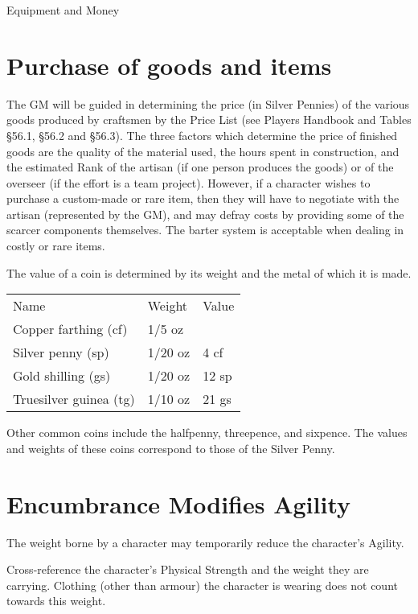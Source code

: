 \begin{Chapter}{Equipment and Money}

\section{Purchase of goods and items}

The GM will be guided in determining the price (in Silver Pennies) of
the various goods produced by craftsmen by the Price List (see Players
Handbook and Tables §56.1, §56.2 and §56.3).  The three factors which
determine the price of finished goods are the quality of the material
used, the hours spent in construction, and the estimated Rank of the
artisan (if one person produces the goods) or of the overseer (if the
effort is a team project). However, if a character wishes to purchase
a custom-made or rare item, then they will have to negotiate with the
artisan (represented by the GM), and may defray costs by providing
some of the scarcer components themselves.  The barter system is
acceptable when dealing in costly or rare items.

The value of a coin is determined by its weight and the metal of which
it is made.

\begin{tabularx}{\columnwidth}{lll}
Name			& Weight	& Value \\
Copper farthing (cf)	& 1/5 oz	& \\
Silver penny (sp)	& 1/20 oz	& 4 cf \\
Gold shilling (gs)	& 1/20 oz	& 12 sp \\ 
Truesilver guinea (tg)	& 1/10 oz	& 21 gs \\
\end{tabularx}

Other common coins include the halfpenny, threepence, and sixpence.
The values and weights of these coins correspond to those of the
Silver Penny.

\section{Encumbrance Modifies Agility}

The weight borne by a character may temporarily reduce the character’s
Agility.

\begin{Enumerate}

\item Cross-reference the character’s Physical Strength and the weight
  they are carrying. Clothing (other than armour) the character is
  wearing does not count towards this weight.


\end{Enumerate}
\end{Chapter}
